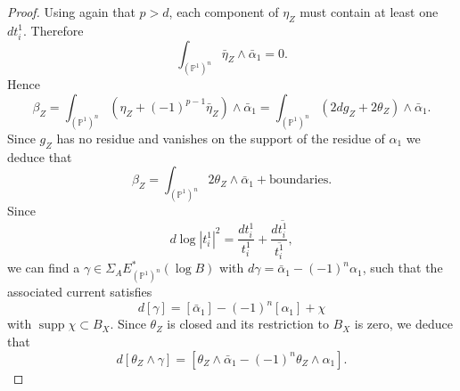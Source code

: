 \documentclass[11pt,a4paper]{amsart}
\renewcommand{\P}{\mathds{P}}
\DeclareMathOperator{\supp}{supp}
\numberwithin{equation}{section}
\theoremstyle{plain}
\theoremstyle{definition}
\begin{document}
\begin{proof}
Using again that $p>d$, each component of $\eta_{Z}$ must contain at
least one $dt^{1}_{i}$. Therefore 
\begin{displaymath}
  \int_{ (\P^{1})^{n}}\bar \eta_{Z} \wedge \bar \alpha _{1}=0.
\end{displaymath}
Hence
\begin{displaymath}
  \beta_{Z}=\int_{ (\P^{1})^{n}}(\eta_{Z}+(-1)^{p-1}\bar \eta_{Z})
  \wedge \bar \alpha _{1}=
  \int_{ (\P^{1})^{n}}(2dg_{Z}+2\theta _{Z})
  \wedge \bar \alpha _{1}.
\end{displaymath}
Since $g_{Z}$ has no residue and vanishes on the support of the
residue of $\alpha _{1}$ we deduce that
\begin{displaymath}
  \beta_{Z}=\int_{ (\P^{1})^{n}}2\theta _{Z}
  \wedge \bar \alpha _{1}+\text{boundaries}.
\end{displaymath}
Since
\begin{displaymath}
  d \log |t^{1}_{i}|^{2}=\frac{dt^{1}_{i}}{t^{1}_i}+
  \frac{d\overline{t^{1}_{i}}}{\overline{t^{1}_i}}, 
\end{displaymath}
we can find a $\gamma \in \Sigma_{A}E^{\ast}_{(\P^{1})^{n}}(\log B)$
with $d \gamma =\bar \alpha _{1}-(-1)^{n}\alpha _{1}$, such that the associated
current satisfies
\begin{displaymath}
  d [\gamma] =[\bar \alpha _{1}]-(-1)^{n}[\alpha _{1}]+\chi
\end{displaymath}
with $\supp \chi\subset B_{X}$. Since $\theta _{Z}$ is closed and its
restriction to $B_{X}$ is zero, we deduce that
\begin{displaymath}
  d[\theta _{Z}\wedge \gamma ]=[\theta _{Z}\wedge \bar \alpha
  _{1}-(-1)^{n}\theta _{Z}\wedge \alpha _{1}]. 
\end{displaymath}

\end{proof}
\end{document}
